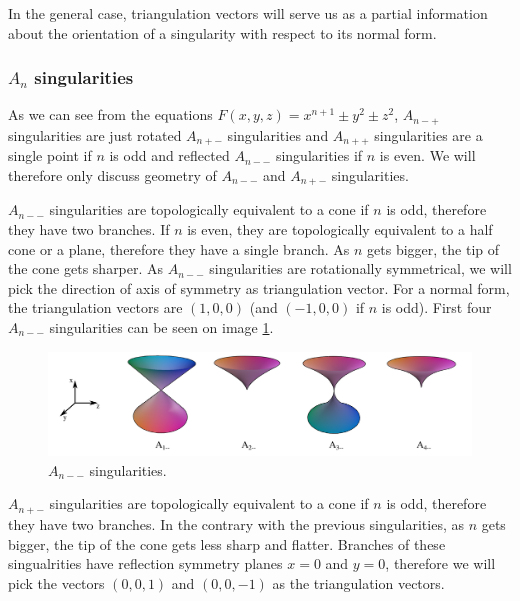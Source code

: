 In the general case, triangulation vectors will serve us
as a partial information about the orientation of a singularity with 
respect to its normal form.

\subsubsection*{$A_n$ singularities}

As we can see from the equations 
$F(x,y,z)=x^{n+1}\pm y^2\pm z^2$, $A_{n-+}$
singularities are just rotated $A_{n+-}$ singularities and $A_{n++}$ singularities
are a single point if $n$ is odd and reflected $A_{n--}$ singularities if $n$ is even. 
We will therefore only discuss geometry of $A_{n--}$ and $A_{n+-}$ singularities.

$A_{n--}$ singularities are topologically equivalent to a cone if $n$ is odd, therefore
they have two branches.
If $n$ is even, they are topologically equivalent to a half cone or a plane, therefore
they have a single branch.
As $n$ gets bigger, the tip of the cone gets sharper. As $A_{n--}$ singularities
are rotationally symmetrical, we will pick the direction of
axis of symmetry as triangulation vector. For a normal form, the triangulation vectors
are $(1, 0, 0)$ (and $(-1, 0, 0)$ if $n$ is odd).
First four $A_{n--}$ singularities can be seen on image \ref{img:4}.

\begin{figure}
    \centerline{\includegraphics[width=1\textwidth]{images/img4}}
    \caption[$A_{n--}$ singularities]
    {$A_{n--}$ singularities. \cite{singsurf}}
    \label{img:4}
\end{figure}


$A_{n+-}$ singularities are topologically equivalent to a cone if $n$ is odd, therefore
they have two branches.
In the contrary with the previous singularities, as $n$ gets bigger, the tip
of the cone gets less sharp and flatter. Branches of these singualrities have 
reflection symmetry planes $x=0$ and $y=0$, therefore we will pick the vectors
$(0, 0, 1)$ and $(0, 0, -1)$ as the triangulation vectors.

